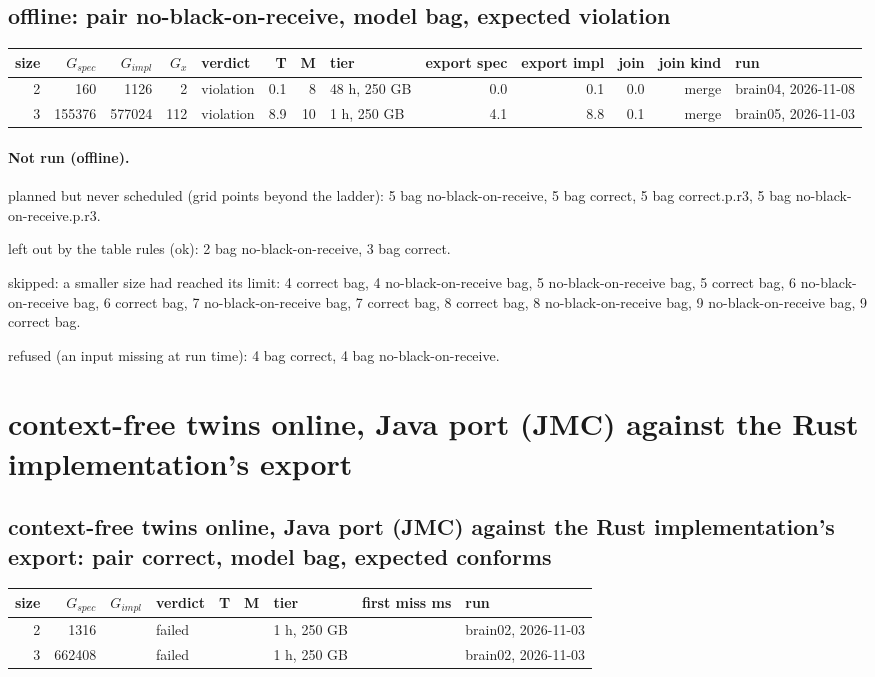 \documentclass[10pt]{article}
\begin{document}
\subsection*{offline: pair \textsf{no-black-on-receive}, model bag, expected violation}
\begin{longtable}{@{}rrrrlrrlrrrrl@{}}
\toprule
size & $G_{\mathit{spec}}$ & $G_{\mathit{impl}}$ & $G_x$ & verdict & T & M & tier & export spec & export impl & join & join kind & run \\
\midrule
\endhead
\color{blue} 2 & 160 & 1126 & 2 & violation & 0.1 & 8 & 48 h, 250 GB & 0.0 & 0.1 & 0.0 & merge & brain04, 2026-11-08 \\
\color{blue} 3 & 155376 & 577024 & 112 & violation & 8.9 & 10 & 1 h, 250 GB & 4.1 & 8.8 & 0.1 & merge & brain05, 2026-11-03 \\
\bottomrule
\end{longtable}
\paragraph{Not run (offline).}
planned but never scheduled (grid points beyond the ladder): 5 bag no-black-on-receive, 5 bag correct, 5 bag correct.p.r3, 5 bag no-black-on-receive.p.r3.\par
left out by the table rules (ok): 2 bag no-black-on-receive, 3 bag correct.\par
skipped: a smaller size had reached its limit: 4 correct bag, 4 no-black-on-receive bag, 5 no-black-on-receive bag, 5 correct bag, 6 no-black-on-receive bag, 6 correct bag, 7 no-black-on-receive bag, 7 correct bag, 8 correct bag, 8 no-black-on-receive bag, 9 no-black-on-receive bag, 9 correct bag.\par
refused (an input missing at run time): 4 bag correct, 4 bag no-black-on-receive.\par
\section*{context-free twins online, Java port (JMC) against the Rust implementation's export}
\subsection*{context-free twins online, Java port (JMC) against the Rust implementation's export: pair \textsf{correct}, model bag, expected conforms}
\begin{longtable}{@{}rrrlrrlrl@{}}
\toprule
size & $G_{\mathit{spec}}$ & $G_{\mathit{impl}}$ & verdict & T & M & tier & first miss ms & run \\
\midrule
\endhead
\color{blue} 2 & 1316 &  & failed &  &  & 1 h, 250 GB &  & brain02, 2026-11-03 \\
\color{blue} 3 & 662408 &  & failed &  &  & 1 h, 250 GB &  & brain02, 2026-11-03 \\
\bottomrule
\end{longtable}
\end{document}
